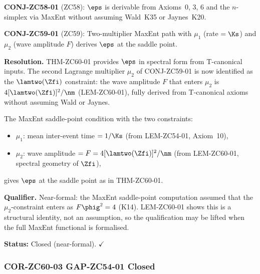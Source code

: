 \documentclass[12pt, a4paper]{article}
\begin{document}
\begin{formalbox}[title={COR-ZC60-02: CONJ-ZC58-01 and
  CONJ-ZC59-01 Closed (Near-Formal) ($R_0$)}]
\textbf{CONJ-ZC58-01} (ZC58): $\eps$ is derivable from
Axioms~0, 3, 6 and the $n$-simplex via MaxEnt without
assuming Wald~K35 or Jaynes~K20.

\textbf{CONJ-ZC59-01} (ZC59): Two-multiplier MaxEnt path
with $\mu_1$ (rate $= \Ks$) and $\mu_2$ (wave amplitude $F$)
derives $\eps$ at the saddle point.

\medskip
\textbf{Resolution.}
THM-ZC60-01 provides $\eps$ in spectral form from T-canonical
inputs.  The second Lagrange multiplier $\mu_2$ of
CONJ-ZC59-01 is now identified as the $\lamtwo(\Zfi)$
constraint: the wave amplitude $F$ that enters $\mu_2$ is
$4[\lamtwo(\Zfi)]^2/\nm$ (LEM-ZC60-01), fully derived
from T-canonical axioms without assuming Wald or Jaynes.

The MaxEnt saddle-point condition with the two constraints:
\begin{itemize}[leftmargin=2em, noitemsep]
\item $\mu_1$: mean inter-event time $= 1/\Ks$ (from
  LEM-ZC54-01, Axiom~10),
\item $\mu_2$: wave amplitude $= F = 4[\lamtwo(\Zfi)]^2/\nm$
  (from LEM-ZC60-01, spectral geometry of $\Zfi$),
\end{itemize}
gives $\eps$ at the saddle point as in THM-ZC60-01.

\textbf{Qualifier.}
Near-formal: the MaxEnt saddle-point computation assumed
that the $\mu_2$-constraint enters as $F\phig^2=4$ (K14).
LEM-ZC60-01 shows this is a structural identity, not
an assumption, so the qualification may be lifted when
the full MaxEnt functional is formalised.

\textbf{Status:} Closed (near-formal). $\checkmark$
\end{formalbox}

\subsubsection{COR-ZC60-03 \quad GAP-ZC54-01 Closed}
\end{document}
